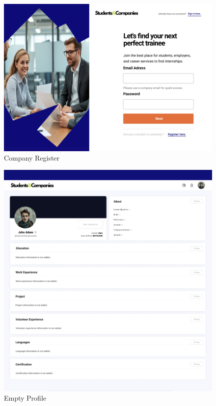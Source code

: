 \documentclass{article}
\begin{document}
\begin{figure}[H]
    \centering
    \includegraphics[scale = 0.40]{figures/UserInterfaces/EmployerRegister.png}
    \caption{Company Register}
     \centering
\end{figure}
\begin{figure}[H]
    \centering
    \includegraphics[scale = 0.35
    ]{figures/UserInterfaces/Empty Profile.png}
    \caption{Empty Profile}
     \centering
\end{figure}
\end{document}
